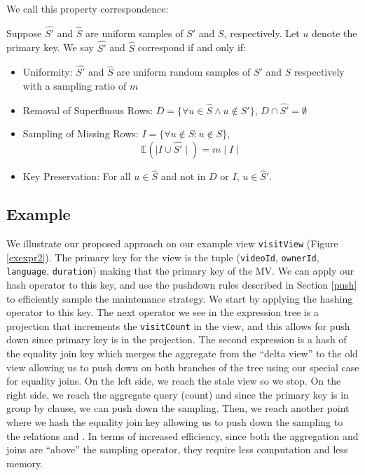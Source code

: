We call this property correspondence:
\begin{property}[Correspondence]
Suppose $\widehat{S'}$ and $\widehat{S}$ are uniform samples of $S'$ and $S$, respectively.  Let $u$ denote the primary key. We say $\widehat{S'}$ and $\widehat{S}$ correspond if and only if:
\vspace{-.25em}
\begin{itemize}[noitemsep]
\item Uniformity: $\widehat{S'}$ and $\widehat{S}$ are uniform random samples of $S'$ and $S$ respectively with a sampling ratio of $m$
\item Removal of Superfluous Rows: $D = \{\forall u \in \widehat{S} \wedge u \not\in S'\}$, $D \cap \widehat{S'} = \emptyset$ 
\item Sampling of Missing Rows: $I = \{\forall u \not\in S : u \not \in S\}$, \[\mathbb{E}(\mid I \cup \widehat{S'} \mid) = m\mid I \mid \]
\item Key Preservation: For all $u\in \widehat{S}$ and not in $D$ or $I$, $u\in \widehat{S}'$.
\end{itemize}
\vspace{-.25em}
\label{correspondence}
\end{property}

\subsection{Example}
We illustrate our proposed approach on our example view \texttt{visitView} (Figure \ref{exexpr2}). 
The primary key for the view is the tuple (\texttt{videoId}, \texttt{ownerId}, \texttt{language}, \texttt{duration}) making that the primary key of the MV.
We can apply our hash operator to this key, and use the pushdown rules described in Section \ref{push} to efficiently sample the maintenance strategy. 
We start by applying the hashing operator to this key.
The next operator we see in the expression tree is a projection that increments the \texttt{visitCount} in the view, and this allows
for push down since primary key is in the projection.
The second expression is a hash of the equality join key which merges the aggregate from the ``delta view'' to the old view allowing us to push down on both branches of the tree using our special case for equality joins.
On the left side, we reach the stale view so we stop.
On the right side, we reach the aggregate query (count) and since the primary key is in group by clause, we can push down the sampling.
Then, we reach another point where we hash the equality join key allowing us to push down the sampling to the relations  and .
In terms of increased efficiency, since both the aggregation and joins are ``above'' the sampling operator, they require less computation and less memory.

